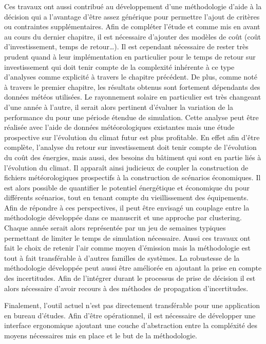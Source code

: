 Ces travaux ont aussi contribué au développement d’une méthodologie d’aide à la décision
qui a l’avantage d’être assez générique pour permettre l’ajout de critères ou contraintes
supplémentaires. Afin de compléter l’étude et comme mis en avant au cours du dernier
chapitre, il est nécessaire d’ajouter des modèles de coût (coût d’investissement, temps de
retour\dots). Il est cependant nécessaire de rester très prudent quand à leur
implémentation en particulier pour le temps de retour sur investissement qui doit tenir
compte de la complexité inhérente à ce type d’analyses comme explicité à travers le
chapitre précédent. De plus, comme noté à travers le premier chapitre, les résultats
obtenus sont fortement dépendants des données météos utilisées. Le rayonnement solaire en
particulier est très changeant d’une année à l’autre, il serait alors pertinent d’évaluer
la variation de la performance du  pour une période étendue de simulation. Cette
analyse peut être réalisée avec l’aide de données météorologiques existantes mais une
étude prospective sur l’évolution du climat futur est plus profitable. En effet afin
d’être complète, l’analyse du retour sur investissement doit tenir compte de l’évolution
du coût des énergies, mais aussi, des besoins du bâtiment qui sont en partie liés à
l’évolution du climat. Il apparaît ainsi judicieux de coupler la construction de fichiers
météorologiques prospectifs à la construction de scénarios économiques. Il est alors
possible de quantifier le potentiel énergétique et économique du  pour différents
scénarios, tout en tenant compte du vieillissement des équipements. Afin de répondre à ces
perspectives, il peut être envisagé un couplage entre la méthodologie développée dans ce
manuscrit et une approche par clustering. Chaque année serait alors représentée par un jeu
de semaines typiques permettant de limiter le temps de simulation nécessaire. Aussi ces
travaux ont fait le choix de retenir l’air comme moyen d’émission mais la méthodologie est
tout à fait transférable à d’autres familles de systèmes. La robustesse de la méthodologie
développée peut aussi être améliorée en ajoutant la prise en compte des incertitudes. Afin
de l’intégrer durant le processus de prise de décision il est alors nécessaire d’avoir
recours à des méthodes de propagation d’incertitudes.

Finalement, l’outil actuel n’est pas directement transférable pour une application en
bureau d’études. Afin d’être opérationnel, il est nécessaire de développer une interface
ergonomique ajoutant une couche d’abstraction entre la compléxité des moyens nécessaires
mis en place et le but de la méthodologie.


